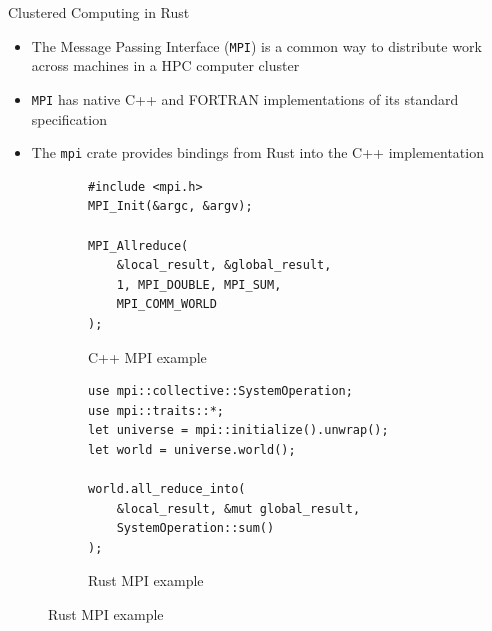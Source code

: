 \documentclass[10pt,aspectratio=169]{beamer}
\begin{document}
\begin{frame}[fragile]{Clustered Computing in Rust}
    \begin{itemize}
        \item The Message Passing Interface (\texttt{MPI}) is a common way to distribute work across machines in a HPC computer cluster
        \item \texttt{MPI} has native C++ and FORTRAN implementations of its standard specification
        \item The \texttt{mpi} crate provides bindings from Rust into the C++ implementation
    \end{itemize}
    \vspace*{0.1cm}
    \begin{figure}
        \begin{subfigure}[c]{.5\textwidth}\centering
            \begin{verbatim}
#include <mpi.h>
MPI_Init(&argc, &argv);

MPI_Allreduce(
    &local_result, &global_result,
    1, MPI_DOUBLE, MPI_SUM,
    MPI_COMM_WORLD
);
            \end{verbatim}
            \label{fig:cpp-mpi}
            \vspace*{0.15cm}
            \caption{C++ MPI example}
        \end{subfigure}%
        \begin{subfigure}[c]{.5\textwidth}\centering
            \begin{verbatim}
use mpi::collective::SystemOperation;
use mpi::traits::*;
let universe = mpi::initialize().unwrap();
let world = universe.world();

world.all_reduce_into(
    &local_result, &mut global_result,
    SystemOperation::sum()
);
            \end{verbatim}
            \label{fig:rust-mpi}
            \caption{Rust MPI example}
        \end{subfigure}
    \end{figure}
\end{frame}
\end{document}
